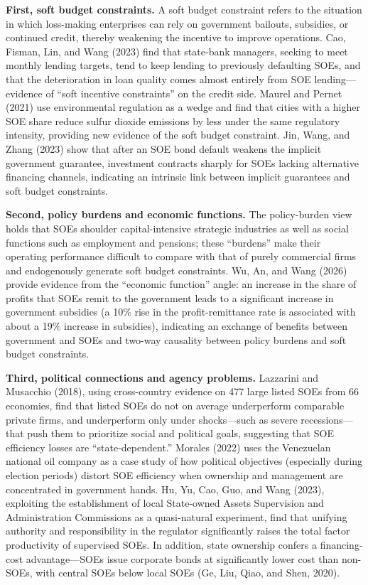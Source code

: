 \documentclass[11pt,a4paper]{article}
\begin{document}
\textbf{First, soft budget constraints.} A soft budget constraint refers to the situation in which loss-making enterprises can rely on government bailouts, subsidies, or continued credit, thereby weakening the incentive to improve operations. Cao, Fisman, Lin, and Wang (2023) find that state-bank managers, seeking to meet monthly lending targets, tend to keep lending to previously defaulting SOEs, and that the deterioration in loan quality comes almost entirely from SOE lending---evidence of ``soft incentive constraints'' on the credit side. Maurel and Pernet (2021) use environmental regulation as a wedge and find that cities with a higher SOE share reduce sulfur dioxide emissions by less under the same regulatory intensity, providing new evidence of the soft budget constraint. Jin, Wang, and Zhang (2023) show that after an SOE bond default weakens the implicit government guarantee, investment contracts sharply for SOEs lacking alternative financing channels, indicating an intrinsic link between implicit guarantees and soft budget constraints.

\textbf{Second, policy burdens and economic functions.} The policy-burden view holds that SOEs shoulder capital-intensive strategic industries as well as social functions such as employment and pensions; these ``burdens'' make their operating performance difficult to compare with that of purely commercial firms and endogenously generate soft budget constraints. Wu, An, and Wang (2026) provide evidence from the ``economic function'' angle: an increase in the share of profits that SOEs remit to the government leads to a significant increase in government subsidies (a 10\% rise in the profit-remittance rate is associated with about a 19\% increase in subsidies), indicating an exchange of benefits between government and SOEs and two-way causality between policy burdens and soft budget constraints.

\textbf{Third, political connections and agency problems.} Lazzarini and Musacchio (2018), using cross-country evidence on 477 large listed SOEs from 66 economies, find that listed SOEs do not on average underperform comparable private firms, and underperform only under shocks---such as severe recessions---that push them to prioritize social and political goals, suggesting that SOE efficiency losses are ``state-dependent.'' Morales (2022) uses the Venezuelan national oil company as a case study of how political objectives (especially during election periods) distort SOE efficiency when ownership and management are concentrated in government hands. Hu, Yu, Cao, Guo, and Wang (2023), exploiting the establishment of local State-owned Assets Supervision and Administration Commissions as a quasi-natural experiment, find that unifying authority and responsibility in the regulator significantly raises the total factor productivity of supervised SOEs. In addition, state ownership confers a financing-cost advantage---SOEs issue corporate bonds at significantly lower cost than non-SOEs, with central SOEs below local SOEs (Ge, Liu, Qiao, and Shen, 2020).
\end{document}
